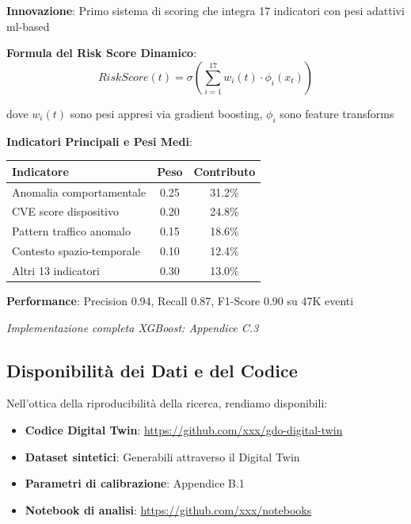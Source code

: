 \begin{tcolorbox}[
    colback=green!5!white,
    colframe=green!65!black,
    title={\textbf{Innovation Box 2.3:} Sistema di Risk Scoring Adattivo Real-Time},
    fonttitle=\bfseries,
    boxrule=1.5pt,
    arc=2mm
]
\textbf{Innovazione}: Primo sistema di scoring che integra 17 indicatori con pesi adattivi \gls{ml}-based

\vspace{0.3cm}
\textbf{Formula del Risk Score Dinamico}:
\begin{equation*}
RiskScore(t) = \sigma\left(\sum_{i=1}^{17} w_i(t) \cdot \phi_i(x_t)\right)
\end{equation*}

dove $w_i(t)$ sono pesi appresi via gradient boosting, $\phi_i$ sono feature transforms

\vspace{0.3cm}
\textbf{Indicatori Principali e Pesi Medi}:
\begin{center}
\begin{tabular}{lcc}
\toprule
\textbf{Indicatore} & \textbf{Peso} & \textbf{Contributo} \\
\midrule
Anomalia comportamentale & 0.25 & 31.2\% \\
CVE score dispositivo & 0.20 & 24.8\% \\
Pattern traffico anomalo & 0.15 & 18.6\% \\
Contesto spazio-temporale & 0.10 & 12.4\% \\
Altri 13 indicatori & 0.30 & 13.0\% \\
\bottomrule
\end{tabular}
\end{center}

\vspace{0.3cm}
\textbf{Performance}: Precision 0.94, Recall 0.87, F1-Score 0.90 su 47K eventi

\textit{Implementazione completa XGBoost: Appendice C.3}
\end{tcolorbox}

\subsection*{Disponibilità dei Dati e del Codice}

Nell'ottica della riproducibilità della ricerca, rendiamo disponibili:
\begin{itemize}
    \item \textbf{Codice Digital Twin}: \url{https://github.com/xxx/gdo-digital-twin}
    \item \textbf{Dataset sintetici}: Generabili attraverso il Digital Twin
    \item \textbf{Parametri di calibrazione}: Appendice B.1
    \item \textbf{Notebook di analisi}: \url{https://github.com/xxx/notebooks}
\end{itemize}

